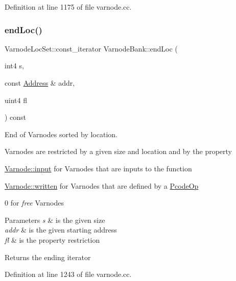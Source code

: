 Definition at line 1175 of file varnode.\+cc.

\mbox{\label{class_varnode_bank_a71bad5566277bed12953f025937a0a9e}} 
\subsubsection{\texorpdfstring{endLoc()}{endLoc()}\hspace{0.1cm}{\footnotesize\ttfamily [5/6]}}
{\footnotesize\ttfamily Varnode\+Loc\+Set\+::const\+\_\+iterator Varnode\+Bank\+::end\+Loc (\begin{DoxyParamCaption}\item[{int4}]{s,  }\item[{const \mbox{\hyperlink{class_address}{Address}} \&}]{addr,  }\item[{uint4}]{fl }\end{DoxyParamCaption}) const}



End of Varnodes sorted by location. 

Varnodes are restricted by a given size and location and by the property
\begin{DoxyItemize}
\item \mbox{\hyperlink{class_varnode_ad367c0ac3c08b6f41e7334e90a138e8ca9c9363556459d8828a5ab58c370ccd2e}{Varnode\+::input}} for Varnodes that are inputs to the function
\item \mbox{\hyperlink{class_varnode_ad367c0ac3c08b6f41e7334e90a138e8ca16c6748ecb7542c2f79d81be83098dd5}{Varnode\+::written}} for Varnodes that are defined by a \mbox{\hyperlink{class_pcode_op}{Pcode\+Op}}
\item 0 for {\itshape free} Varnodes 
\begin{DoxyParams}{Parameters}
{\em s} & is the given size \\
\hline
{\em addr} & is the given starting address \\
\hline
{\em fl} & is the property restriction \\
\hline
\end{DoxyParams}
\begin{DoxyReturn}{Returns}
the ending iterator 
\end{DoxyReturn}

\end{DoxyItemize}

Definition at line 1243 of file varnode.\+cc.

